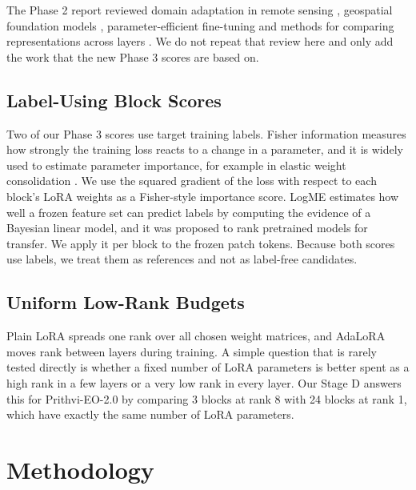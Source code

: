 \documentclass[11pt,a4paper]{report}
\begin{document}
The Phase 2 report reviewed domain adaptation in remote sensing \cite{tuia2016domain,ganin2016domain}, geospatial foundation models \cite{he2022masked,cong2022satmae,jakubik2023foundation,szwarcman2024prithvi}, parameter-efficient fine-tuning \cite{houlsby2019parameter,hu2022lora,zhang2023adalora,lee2023surgical} and methods for comparing representations across layers \cite{raghu2017svcca,kornblith2019similarity,gretton2012kernel}. We do not repeat that review here and only add the work that the new Phase 3 scores are based on.

\section{Label-Using Block Scores}

Two of our Phase 3 scores use target training labels. Fisher information measures how strongly the training loss reacts to a change in a parameter, and it is widely used to estimate parameter importance, for example in elastic weight consolidation \cite{kirkpatrick2017overcoming}. We use the squared gradient of the loss with respect to each block's LoRA weights as a Fisher-style importance score. LogME \cite{you2021logme} estimates how well a frozen feature set can predict labels by computing the evidence of a Bayesian linear model, and it was proposed to rank pretrained models for transfer. We apply it per block to the frozen patch tokens. Because both scores use labels, we treat them as references and not as label-free candidates.

\section{Uniform Low-Rank Budgets}

Plain LoRA spreads one rank over all chosen weight matrices, and AdaLoRA \cite{zhang2023adalora} moves rank between layers during training. A simple question that is rarely tested directly is whether a fixed number of LoRA parameters is better spent as a high rank in a few layers or a very low rank in every layer. Our Stage D answers this for Prithvi-EO-2.0 by comparing 3 blocks at rank 8 with 24 blocks at rank 1, which have exactly the same number of LoRA parameters.

\chapter{Methodology}
\label{ch:method}
\end{document}
